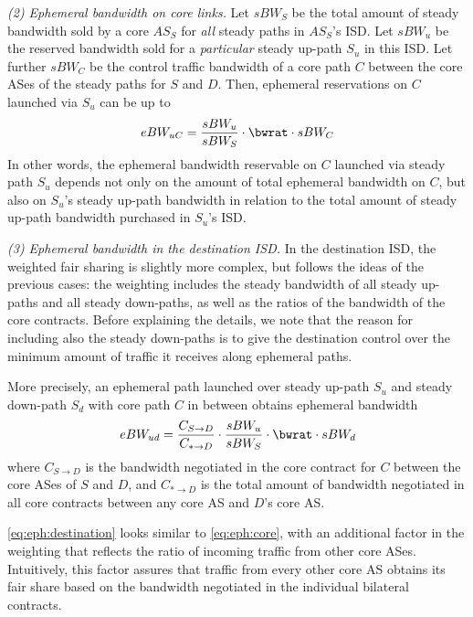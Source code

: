\emph{(2) Ephemeral bandwidth on core links.} Let $sBW_{S}$ be the
total amount of steady bandwidth sold by a core $AS_S$ for \emph{all}
steady paths in $AS_S$'s ISD. Let $sBW_u$ be the reserved bandwidth
sold for a \emph{particular} steady up-path $S_u$ in this ISD. Let
further $sBW_C$ be the control traffic bandwidth of a core path $C$
between the core ASes of the steady paths for $S$ and $D$. Then,
ephemeral reservations on $C$ launched via $S_u$ can be up to
\begin{equation}
  \label{eq:eph:core}
  eBW_{uC} = \frac{sBW_u}{sBW_S} \cdot \bwrat \cdot sBW_C
\end{equation}
In other words, the ephemeral bandwidth reservable on $C$ launched via steady
path $S_u$ depends not only on the amount of total ephemeral
bandwidth on $C$, but also on $S_u$'s steady up-path bandwidth in
relation to the total amount of steady up-path bandwidth purchased in
$S_u$'s ISD.


\emph{(3) Ephemeral bandwidth in the destination ISD.} In the
destination ISD, the weighted fair sharing is slightly more complex,
but follows the ideas of the previous cases: the weighting includes
the steady bandwidth of all steady up-paths and all steady
down-paths, as well as the ratios of the bandwidth of the core
contracts. Before explaining the details, we note that the reason for
including also the steady down-paths is to give the destination \AD
control over the minimum amount of traffic it receives along
ephemeral paths.

More precisely, an ephemeral path launched over steady up-path $S_u$
and steady down-path $S_d$ with core path $C$ in between obtains
ephemeral bandwidth
\begin{equation}
  \label{eq:eph:destination}
  eBW_{ud} = \frac{C_{S\to D}}{C_{*\to D}} \cdot \frac{sBW_u}{sBW_S} \cdot \bwrat \cdot sBW_{d}
\end{equation}
where $C_{S\to D}$ is the bandwidth negotiated in the core contract
for $C$ between the core ASes of $S$ and $D$, and $C_{*\to D}$ is the total
amount of bandwidth negotiated in all core contracts between any core
AS and $D$'s core AS.

\autoref{eq:eph:destination} looks similar to
\autoref{eq:eph:core}, with an additional factor in the weighting
that reflects the ratio of incoming traffic from other core ASes.
Intuitively, this factor assures that traffic from every other core
AS obtains its fair share based on the bandwidth negotiated in the
individual bilateral contracts.


